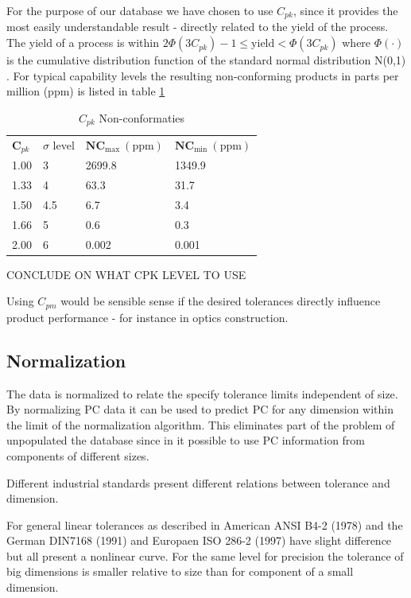 \documentclass[aip,amsmath, reprint, author-year]{revtex4-1}
\begin{document}
For the purpose of our database we have chosen to use $C_{pk}$, since it provides the most easily understandable result - directly related to the yield of the process. The yield of a process is within $2\Phi(3C_{pk})-1 \leq \text{yield} < \Phi(3C_{pk})$ where $\Phi(\cdot)$ is the cumulative distribution function of the standard normal distribution N(0,1) \citep{boyles1991taguchi}. For typical capability levels the resulting non-conforming products in parts per million (ppm) is listed in table \ref{tab:cpl_nc}

\begin{table}
\begin{ruledtabular}
\caption{\label{tab:cpl_nc} $C_{pk}$ Non-conformaties}
\begin{tabular}{llll}
  $\mathbf{C}_{pk}$	& $\sigma$ level	& $\mathbf{NC_\mathrm{max}} \mathrm{\ (ppm)}$	&  $\mathbf{NC_\mathrm{min}} \mathrm{\ (ppm)}$	\\
  1.00	& 3		& 2699.8		& 1349.9		\\
  1.33 	& 4 		& 63.3		& 31.7 		\\
  1.50 	& 4.5 	& 6.7		& 3.4		\\
  1.66	& 5		& 0.6		& 0.3		\\
  2.00	& 6		& 0.002		& 0.001		\\
\end{tabular}%
\end{ruledtabular}
\end{table}

CONCLUDE ON WHAT CPK LEVEL TO USE

Using $C_{pm}$ would be sensible sense if the desired tolerances directly influence product performance - for instance in optics construction.  


\subsection{Normalization}

The data is normalized to relate the specify tolerance limits independent of size. By normalizing PC data it can be used to predict PC for any dimension within the limit of the normalization algorithm. 
This eliminates part of the problem of unpopulated the database since in it possible to use PC information from components of different sizes.

Different industrial standards present different relations between tolerance and dimension. 

For general linear tolerances as described in American ANSI B4-2 (1978) and the German DIN7168 (1991) and Europaen ISO 286-2 (1997) have slight difference but all present a nonlinear curve. For the same level for precision the tolerance of big dimensions is smaller relative to size than for component of a small dimension.
\end{document}

